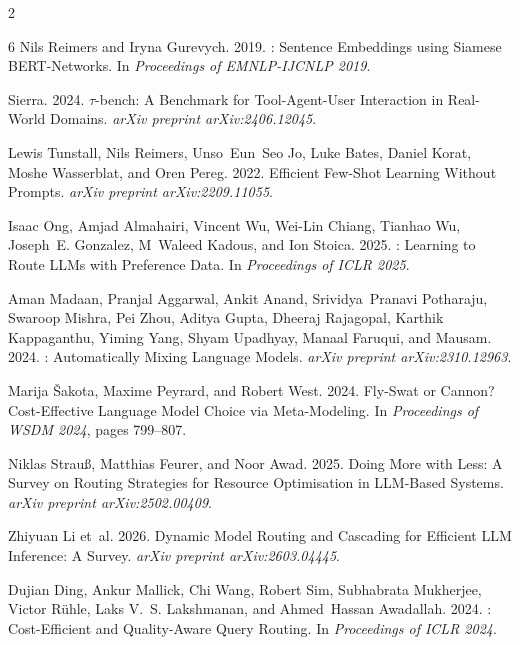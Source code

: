 \documentclass[11pt,a4paper]{article}
\begin{document}
\begin{multicols}{2}
\begin{thebibliography}{6}
Nils Reimers and Iryna Gurevych. 2019.
: Sentence Embeddings using {Siamese} {BERT}-Networks.
\newblock In \emph{Proceedings of EMNLP-IJCNLP 2019}.

Sierra. 2024.
\newblock $\tau$-bench: A Benchmark for Tool-Agent-User Interaction in Real-World Domains.
\newblock \emph{arXiv preprint arXiv:2406.12045}.

Lewis Tunstall, Nils Reimers, Unso~Eun~Seo Jo, Luke Bates, Daniel Korat, Moshe Wasserblat, and Oren Pereg. 2022.
\newblock Efficient Few-Shot Learning Without Prompts.
\newblock \emph{arXiv preprint arXiv:2209.11055}.

Isaac Ong, Amjad Almahairi, Vincent Wu, Wei-Lin Chiang, Tianhao Wu, Joseph~E. Gonzalez, M~Waleed Kadous, and Ion Stoica. 2025.
: Learning to Route {LLMs} with Preference Data.
\newblock In \emph{Proceedings of ICLR 2025}.

Aman Madaan, Pranjal Aggarwal, Ankit Anand, Srividya~Pranavi Potharaju, Swaroop Mishra, Pei Zhou, Aditya Gupta, Dheeraj Rajagopal, Karthik Kappaganthu, Yiming Yang, Shyam Upadhyay, Manaal Faruqui, and Mausam. 2024.
: Automatically Mixing Language Models.
\newblock \emph{arXiv preprint arXiv:2310.12963}.

Marija {\v{S}}akota, Maxime Peyrard, and Robert West. 2024.
\newblock Fly-Swat or Cannon? {Cost-Effective} Language Model Choice via Meta-Modeling.
\newblock In \emph{Proceedings of WSDM 2024}, pages 799--807.

Niklas Strau{\ss}, Matthias Feurer, and Noor Awad. 2025.
\newblock Doing More with Less: A Survey on Routing Strategies for Resource Optimisation in {LLM}-Based Systems.
\newblock \emph{arXiv preprint arXiv:2502.00409}.

Zhiyuan Li et~al. 2026.
\newblock Dynamic Model Routing and Cascading for Efficient {LLM} Inference: A Survey.
\newblock \emph{arXiv preprint arXiv:2603.04445}.

Dujian Ding, Ankur Mallick, Chi Wang, Robert Sim, Subhabrata Mukherjee, Victor R{\"u}hle, Laks V.~S. Lakshmanan, and Ahmed~Hassan Awadallah. 2024.
: Cost-Efficient and Quality-Aware Query Routing.
\newblock In \emph{Proceedings of ICLR 2024}.


\end{thebibliography}
\end{multicols}
\end{document}
